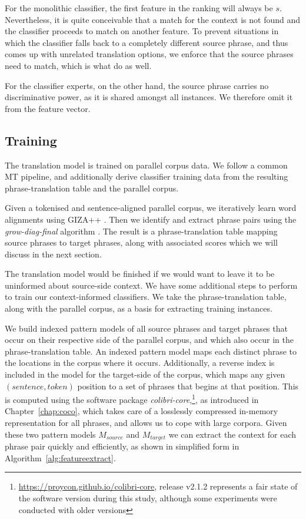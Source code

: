 For the monolithic classifier, the first feature in the ranking will always be
$s$. Nevertheless, it is quite conceivable that a match for the context is not
found and the classifier proceeds to match on another feature. To prevent
situations in which the classifier falls back to a completely different source
phrase, and thus comes up with unrelated translation options, we enforce that
the source phrases need to match, which is what \cite{Stroppa+07} do as
well.

For the classifier experts, on the other hand, the source
phrase carries no discriminative power, as it is shared amongst all instances. We
therefore omit it from the feature vector.

\subsection{Training}

The translation model is trained on parallel corpus data. We follow a common MT
pipeline, and additionally derive classifier training data from the
resulting phrase-translation table and the parallel corpus.

Given a tokenised and sentence-aligned parallel corpus, we iteratively learn
word alignments using GIZA++ \citep{GIZA}. Then we identify and extract phrase
pairs using the {\em grow-diag-final}\/ algorithm \citep{OchNey2003}. The
result is a phrase-translation table mapping source phrases to target
phrases, along with associated scores which we will discuss in the next
section. %

The translation model would be finished if we would want to leave it to be
uninformed about source-side context. We have some additional steps to perform
to train our context-informed classifiers. We take the phrase-translation
table, along with the parallel corpus, as a basis for extracting training
instances.

We build indexed pattern models of all source phrases and target phrases that
occur on their respective side of the parallel corpus, and which also occur in
the phrase-translation table. An indexed pattern model maps each distinct
phrase to the locations in the corpus where it occurs.  Additionally, a reverse
index is included in the model for the target-side of the corpus, which maps
any given $(sentence, token)$ position to a set of phrases that begins at that
position.  This is computed using the software package
\emph{colibri-core},\footnote{\url{https://proycon.github.io/colibri-core},
release v2.1.2 represents a fair state of the software version during this study, although some experiments were conducted with older versions}, as introduced in
Chapter~\ref{chap:coco},  which takes care of a losslessly compressed in-memory
representation for all phrases, and allows us to cope with large corpora. Given
these two pattern models $M_{source}$ and $M_{target}$ we can extract the
context for each phrase pair quickly and efficiently, as shown in simplified
form in Algorithm~\ref{alg:featureextract}.

